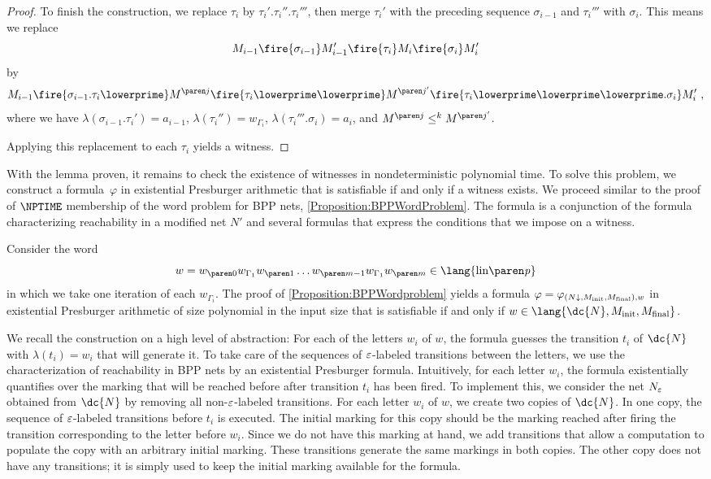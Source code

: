 \documentclass[../../diss.tex]{subfiles}
\begin{document}
\begin{proof}
    To finish the construction, we replace $\tau_i$ by $\tau_i'.\tau_i''.\tau_i'''$, then merge $\tau_i'$ with the preceding sequence $\sigma_{i-1}$ and $\tau_i'''$ with $\sigma_{i}$.
    This means we replace
    \[
        M_{i-1} \fire{\sigma_{i-1}} M_{i-1}' \fire{\tau_i} M_i \fire{\sigma_i} M_i'
    \]
    by
    \[
        M_{i-1} \fire{\sigma_{i-1}.\tau_i\lowerprime} \itr{M}{j} \fire{\tau_i\lowerprime\lowerprime} \itr{M}{j'} \fire{\tau_i\lowerprime\lowerprime\lowerprime.\sigma_i} M_i'
        \ ,
    \]
    where we have $\lambda(\sigma_{i-1}.\tau_i') = a_{i-1}$,
    $\lambda(\tau_i'') = w_{\Gamma_i}$,
    $\lambda(\tau_i'''.\sigma_{i}) = a_{i}$,
    and $\itr{M}{j} \leqk \itr{M}{j'}$.

    Applying this replacement to each $\tau_i$ yields a witness.
\end{proof}

With the lemma proven, it remains to check the existence of witnesses in nondeterministic polynomial time.
To solve this problem, we construct a formula~$\varphi$ in existential Presburger arithmetic that is satisfiable if and only if a witness exists.
We proceed similar to the proof of $\NPTIME$ membership of the word problem for BPP nets, \cref{Proposition:BPPWordProblem}.
The formula is a conjunction of the formula characterizing reachability in a modified net $N'$ and several formulas that express the conditions that we impose on a witness.

Consider the word
\[
    w = \dtr{w}{0} w_{\Gamma_1} \dtr{w}{1} \ldots \dtr{w}{m-1} w_{\Gamma_1} \dtr{w}{m} \in \lang{\linof{\product}}
\]
in which we take one iteration of each $w_{\Gamma_i}$.
The proof of \cref{Proposition:BPPWordproblem} yields a formula
$\varphi = \varphi_{({N \downarrow},M_{\text{init}},M_{\text{final}}),w}$ in existential Presburger arithmetic
of size polynomial in the input size that is satisfiable if and only if $w \in \lang{\dc{N},\Minit,\Mfinal}$.

We recall the construction on a high level of abstraction:
For each of the letters $w_i$ of $w$, the formula guesses the transition $t_i$ of $\dc{N}$ with $\lambda(t_i) = w_i$ that will generate it.
To take care of the sequences of $\varepsilon$-labeled transitions between the letters, we use the characterization of reachability in BPP nets by an existential Presburger formula.
Intuitively, for each letter $w_i$, the formula existentially quantifies over the marking that will be reached before \resp after transition $t_i$ has been fired.
To  implement this, we consider the net $N_\varepsilon$ obtained from $\dc{N}$ by removing all non-$\varepsilon$-labeled transitions.
For each letter $w_i$ of $w$, we create two copies of $\dc{N}$.
In one copy, the sequence of $\varepsilon$-labeled transitions before $t_i$ is executed.
The initial marking for this copy should be the marking reached after firing the transition corresponding to the letter before $w_i$.
Since we do not have this marking at hand, we add transitions that allow a computation to populate the copy with an arbitrary initial marking.
These transitions generate the same markings in both copies.
The other copy does not have any transitions; it is simply used to keep the initial marking available for the formula.
\end{document}
